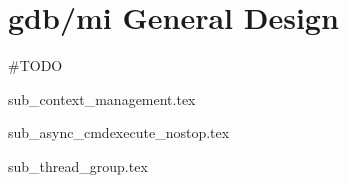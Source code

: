 \section{gdb/mi General Design}

\#TODO

{sub_context_management.tex}

{sub_async_cmdexecute_nostop.tex}

{sub_thread_group.tex}
